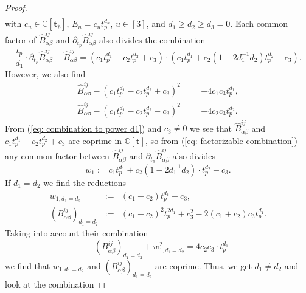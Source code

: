 \documentclass[10pt]{article}
\theoremstyle{remark}%
\theoremstyle{definition}%
\begin{document}
\begin{proof}
\begin{eqnarray}
\label{eq: univariate B}
\end{eqnarray}
with $c_{u}\in\mathbb{C}[\mathbf{t}_{\hat{p}}]$, $E_{u}=c_{u}t_{p}^{d_{u}}$, $u\in[3]$, and $d_{1}\geq d_{2}\geq d_{3}=0$. Each common factor of $\hat{B}_{\alpha\beta}^{ij}$ and $\partial_{t_{p}}\hat{B}_{\alpha\beta}^{ij}$ also divides the combination 
 \begin{equation}
\frac{t_{p}}{d_{1}}\cdot \partial_{t_{p}}\hat{B}_{\alpha\beta}^{ij}-\hat{B}_{\alpha\beta}^{ij} =  \left(c_{1}t_{p}^{d_{1}}-c_{2}t_{p}^{d_{2}}+c_{3}\right)\cdot \left(c_{1}t_{p}^{d_{1}}+c_{2}(1-2d_{1}^{-1}d_{2}) t_{p}^{d_{2}}-c_{3}\right).
\label{eq: factorizable combination}
 \end{equation}
However, we also find 
\begin{eqnarray}
\hat{B}_{\alpha\beta}^{ij}-(c_{1}t_{p}^{d_{1}}-c_{2}t_{p}^{d_{2}}+c_{3})^{2} & = & -4c_{1}c_{3}t_{p}^{d_{1}},
\label{eq: combination to power d1}\\
\hat{B}_{\alpha\beta}^{ij}-(c_{1}t_{p}^{d_{1}}-c_{2}t_{p}^{d_{2}}-c_{3})^{2} & = & -4c_{2}c_{3}t_{p}^{d_{2}}.
\label{eq: combination to power d2}
\end{eqnarray}
From (\ref{eq: combination to power d1}) and $c_3\neq 0$ we see that $\hat{B}_{\alpha\beta}^{ij}$
and $c_{1}t_{p}^{d_{1}}-c_{2}t_{p}^{d_{2}}+c_{3}$ are coprime in $\mathbb{C}[\mathbf{t}]$, so from (\ref{eq: factorizable combination}) any common factor between
$\hat{B}_{\alpha\beta}^{ij}$ and $\partial_{t_{p}}\hat{B}_{\alpha\beta}^{ij}$ also divides 
\begin{equation*}
w_{1}:=c_{1}t_{p}^{d_{1}}+c_{2}(1-2d_{1}^{-1}d_{2})\cdot t_{p}^{d_{2}}-c_{3}.
\end{equation*}
If $d_{1}=d_{2}$ we find the reductions 
\begin{eqnarray}
w_{1,d_{1}=d_{2}} & := & (c_{1}-c_{2})t_{p}^{d_{1}}-c_{3},
\label{eq: w_1, case d_1=d_2}\\
(B_{\alpha\beta}^{ij})_{d_{1}=d_{2}} & := & (c_{1}-c_{2})^{2}t_{p}^{2d_{1}}+c_{3}^{2}-2(c_{1}+c_{2})c_{3}t_{p}^{d_{1}}.
\label{eq: B, case d_1=d_2}
\end{eqnarray}
Taking into account their combination 
 \begin{equation}
    - (B_{\alpha\beta}^{ij})_{d_{1}=d_{2}} + w_{1,d_{1}=d_{2}}^2 = 4 c_{2} c_{3} \cdot t_{p}^{d_{1}}
\label{eq: linear combination of B and w_1, case d_1=d_2}
 \end{equation}
we find that $w_{1,d_{1}=d_{2}}$ and $(B_{\alpha\beta}^{ij})_{d_{1}=d_{2}}$ are coprime. Thus, we get $d_{1}\neq d_{2}$ and look at the combination 

\end{proof}
\end{document}
